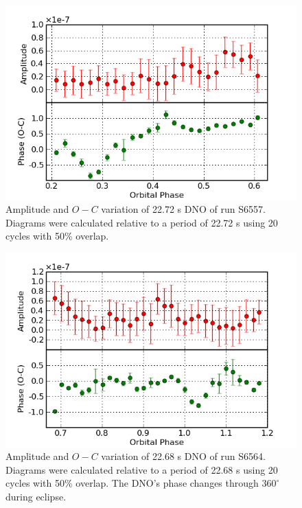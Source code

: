 \begin{figure}
 \centering
 \includegraphics[bb=0 0 600 400,width=0.85\columnwidth]{images/archive_phot/S6557/S6557_22.72.png}
 \caption[S6557 $O-C$ diagram of DNO]{Amplitude and $O-C$ variation of 22.72 s DNO of run S6557. Diagrams were calculated relative to a period of 22.72 s using 20 cycles with 50\% overlap. }
 \label{S6557_22.72}
\end{figure}

\begin{figure}
 \centering
 \includegraphics[bb=0 0 600 400,width=0.85\columnwidth]{images/archive_phot/S6564/S6564_22.68.png}
 \caption[S6564 $O-C$ diagram of DNO]{Amplitude and $O-C$ variation of 22.68 s DNO of run S6564. Diagrams were calculated relative to a period of 22.68 s using 20 cycles with 50\% overlap. The DNO's phase changes through $360^{\circ}$ during eclipse. }
 \label{S6564_22.68}
\end{figure}

